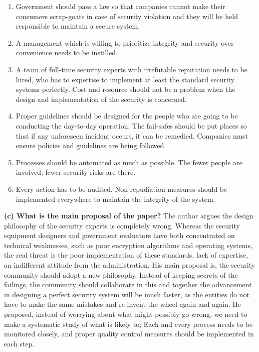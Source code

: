 \documentclass{article}
\begin{document}
\begin{enumerate}

\item Government should pass a law so that companies cannot make their consumers scrap-goats in case of security violation and they will be held responsible to maintain a secure system.

\item A management which is willing to prioritize integrity and security over convenience needs to be instilled.

\item A team of full-time security experts with irrefutable reputation needs to be hired, who has to expertise to implement at least the standard security systems perfectly. Cost and resource should not be a problem when the design and implementation of the security is concerned.

\item Proper guidelines should be designed for the people who are going to be conducting the day-to-day operation. The fail-safes should be put places so that if any unforeseen incident occurs, it can be remedied. Companies must ensure policies and guidelines are being followed.

\item Processes should be automated as much as possible. The fewer people are involved, fewer security risks are there.

\item Every action has to be audited. Non-repudiation measures should be implemented everywhere to maintain the integrity of the system.

\end{enumerate}
\newline \newline \textbf{(c) What is the main proposal of the paper?}
\newline \newline The author argues the design philosophy of the security experts is completely wrong. Whereas the security equipment designers and government evaluators have both concentrated on technical weaknesses,
such as poor encryption algorithms and operating systems, the real threat is the poor implementation of these standards, lack of expertise, an indifferent attitude from the administration.
\newline \newline His main proposal is, the security community should adopt a new philosophy. Instead of keeping secrets of the failings, the community should collaborate in this and together the advancement in designing a perfect security system will be much faster, as the entities do not have to make the same mistakes and re-invent the wheel again and again. He proposed, instead of worrying about what might possibly go wrong, we need to make a systematic study of what is likely to; Each and every process needs to be monitored closely, and proper quality control measures should be implemented in each step.
\end{document}

